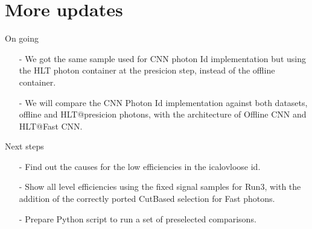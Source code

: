 \documentclass[aspectratio=1610,8pt]{beamer}					%
\begin{document}
\section{More updates}
\begin{frame}
    \begin{block}{On going}
        \begin{itemize}
            \item [-]
                We got the same sample used for CNN photon Id implementation but using the HLT photon container at the presicion step,
                instead of the offline container.
            \item [-]
                We will compare the CNN Photon Id implementation against both datasets,
                offline and HLT@presicion photons,
                with the architecture of Offline CNN and HLT@Fast CNN.
        \end{itemize}
    \end{block}
    \begin{block}{Next steps}
    \begin{itemize}
        \item [-]
            Find out the causes for the low efficiencies in the icalovloose id.
        \item [-]
            Show all level efficiencies using the fixed signal samples for Run3,
            with the addition of the correctly ported CutBased selection for Fast photons.
        \item [-]
            Prepare Python script to run a set of preselected comparisons.
    \end{itemize}
    \end{block}
\end{frame}
\end{document}
